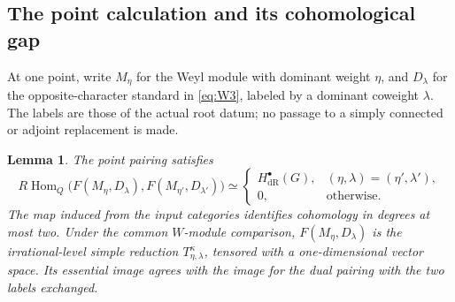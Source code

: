 \documentclass[11pt]{article}
\numberwithin{equation}{section}
\newtheorem{lemma}[theorem]{Lemma}
\theoremstyle{definition}
\theoremstyle{remark}
\begin{document}
\subsection{The point calculation and its cohomological gap}

At one point, write $M_\eta$ for the Weyl module with dominant weight
$\eta$, and $D_\lambda$ for the opposite-character standard in
\eqref{eq:W3}, labeled by a dominant coweight $\lambda$.  The labels
are those of the actual root datum; no passage to a simply connected
or adjoint replacement is made.

\begin{lemma}\label{local:point-gap}
The point pairing satisfies
\begin{equation}\label{eq:L10}
 R\operatorname{Hom}_{Q}
 \bigl(F(M_\eta,D_\lambda),F(M_{\eta'},D_{\lambda'})\bigr)
 \simeq
 \begin{cases}
 H^\bullet_{\mathrm{dR}}(G),&
                    (\eta,\lambda)=(\eta',\lambda'),\\
 0,&\text{otherwise}.
 \end{cases}
\end{equation}
The map induced from the input categories identifies cohomology
in degrees at most two.  Under the common $W$-module comparison,
$F(M_\eta,D_\lambda)$ is the irrational-level simple reduction
$T^\kappa_{\eta,\lambda}$, tensored with a one-dimensional vector
space.  Its essential image agrees with the image for the dual
pairing with the two labels exchanged.
\end{lemma}
\end{document}
